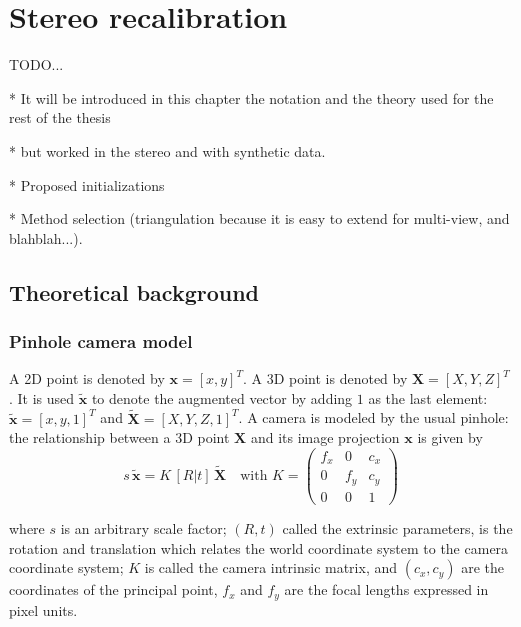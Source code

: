 \chapter{Stereo recalibration}
\label{cha:stereo_recalibration}

TODO...

* It will be introduced in this chapter the notation and the theory used for the rest of the thesis

* but worked in the stereo and with synthetic data.

* Proposed initializations

* Method selection (triangulation because it is easy to extend for multi-view, and blahblah...).


\section{Theoretical background}
\label{sec:theoretical_background}

\subsection{Pinhole camera model}

A 2D point is denoted by $\mathbf{x} = [x,y]^T$. A 3D point is denoted by $\mathbf{X} = [X,Y,Z]^T$. It is used $\mathbf{\tilde{x}}$ to denote the augmented vector by adding $1$ as the last element: $\mathbf{\tilde{x}} = [x,y,1]^T$ and $\mathbf{\tilde{X}} = [X,Y,Z,1]^T$. A camera is modeled by the usual pinhole: the relationship between a 3D point $\mathbf{X}$ and its image projection $\mathbf{x}$ is given by
\begin{equation} \label{eq:pinhole}
  s\,\mathbf{\tilde{x}} = K\, [R | t]\,\mathbf{\tilde{X}} \quad \mbox{with } K =
    \begin{pmatrix}
      f_x & 0   & c_x \\
      0   & f_y & c_y \\
      0   & 0   & 1
\end{pmatrix}
\end{equation}

\noindent
where $s$ is an arbitrary scale factor; $(R,t)$ called the extrinsic parameters, is the rotation and translation which relates the world coordinate system to the camera coordinate system; $K$ is called the camera intrinsic matrix, and $(c_x,c_y)$ are the coordinates of the principal point, $f_x$ and $f_y$ are the focal lengths expressed in pixel units.




